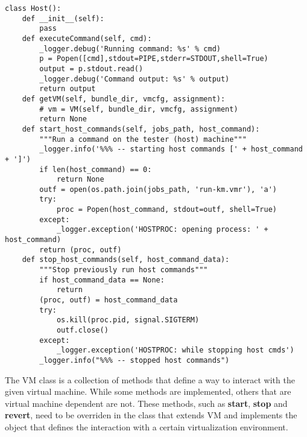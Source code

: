 \lstset{caption=Generic Host implementation, language=python, label=lst:generic-host}
\begin{lstlisting}
class Host():
    def __init__(self):
        pass
    def executeCommand(self, cmd):
        _logger.debug('Running command: %s' % cmd)
        p = Popen([cmd],stdout=PIPE,stderr=STDOUT,shell=True)
        output = p.stdout.read()
        _logger.debug('Command output: %s' % output)
        return output
    def getVM(self, bundle_dir, vmcfg, assignment):
        # vm = VM(self, bundle_dir, vmcfg, assignment)
        return None
    def start_host_commands(self, jobs_path, host_command):
        """Run a command on the tester (host) machine"""
        _logger.info('%%% -- starting host commands [' + host_command + ']')
        if len(host_command) == 0:
            return None
        outf = open(os.path.join(jobs_path, 'run-km.vmr'), 'a')
        try:
            proc = Popen(host_command, stdout=outf, shell=True)
        except:
            _logger.exception('HOSTPROC: opening process: ' + host_command)
        return (proc, outf)
    def stop_host_commands(self, host_command_data):
        """Stop previously run host commands"""
        if host_command_data == None:
            return
        (proc, outf) = host_command_data
        try:
            os.kill(proc.pid, signal.SIGTERM)
            outf.close()
        except:
            _logger.exception('HOSTPROC: while stopping host cmds')
        _logger.info("%%% -- stopped host commands")
\end{lstlisting}


The VM class is a collection of methods that define a way to interact with the
given virtual machine. While some methods are implemented, others that are
virtual machine dependent are not. These methods, such as \textbf{start}, 
\textbf{stop} and \textbf{revert}, need to be overriden in the 
class that extends VM and implements the object that defines the interaction
with a certain virtualization environment.

\begin{center}
\end{center}



